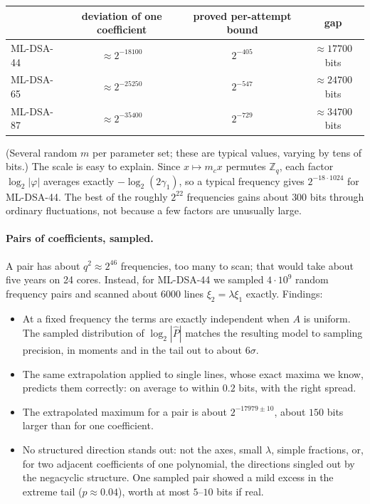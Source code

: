 \documentclass[11pt]{article}
\theoremstyle{definition}
\theoremstyle{remark}
\newcommand{\Zq}{\mathbb{Z}_q}
\begin{document}
\begin{center}
\begin{tabular}{lccc}
\toprule
 & deviation of one coefficient & proved per-attempt bound & gap \\
\midrule
ML-DSA-44 & $\approx2^{-18100}$ & $2^{-405}$ & ${\approx}17700$ bits \\
ML-DSA-65 & $\approx2^{-25250}$ & $2^{-547}$ & ${\approx}24700$ bits \\
ML-DSA-87 & $\approx2^{-35400}$ & $2^{-729}$ & ${\approx}34700$ bits \\
\bottomrule
\end{tabular}
\end{center}
(Several random $m$ per parameter set; these are typical values, varying by tens of bits.) The
scale is easy to explain. Since $x\mapsto m_c x$ permutes $\Zq$, each factor $\log_2|\varphi|$
averages exactly $-\log_2(2\gamma_1)$, so a typical frequency gives $2^{-18\cdot1024}$ for
ML-DSA-44. The best of the roughly $2^{22}$ frequencies gains about $300$ bits through ordinary
fluctuations, not because a few factors are unusually large.

\paragraph{Pairs of coefficients, sampled.}
A pair has about $q^2\approx2^{46}$ frequencies, too many to scan; that would take about five
years on 24 cores. Instead, for ML-DSA-44 we sampled $4\cdot10^9$ random frequency pairs and
scanned about $6000$ lines $\xi_2=\lambda\xi_1$ exactly. Findings:
\begin{itemize}
  \item At a fixed frequency the terms are exactly independent when $A$ is uniform. The sampled
        distribution of $\log_2|\hat P|$ matches the resulting model to sampling precision, in
        moments and in the tail out to about $6\sigma$.
  \item The same extrapolation applied to single lines, whose exact maxima we know, predicts
        them correctly: on average to within $0.2$ bits, with the right spread.
  \item The extrapolated maximum for a pair is about $2^{-17979\pm10}$, about $150$ bits larger
        than for one coefficient.
  \item No structured direction stands out: not the axes, small $\lambda$, simple fractions, or,
        for two adjacent coefficients of one polynomial, the directions singled out by the
        negacyclic structure. One sampled pair showed a mild excess in the extreme tail
        ($p\approx0.04$), worth at most $5$--$10$ bits if real.
\end{itemize}
\end{document}
